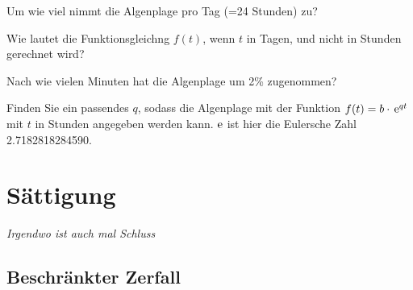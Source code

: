 \begin{bbwAufgabenBlock}

\item Um wie viel nimmt die Algenplage pro Tag (=24 Stunden) zu?



\item Wie lautet die Funktionsgleichng $f(t)$, wenn $t$ in Tagen, und nicht in Stunden gerechnet wird?


\item Nach wie vielen Minuten hat die Algenplage um 2\% zugenommen?


\item Finden Sie ein passendes $q$, sodass die Algenplage mit der Funktion $f(t) = b\cdot{}\operatorname{\mathrm{e}}^{qt}$ mit $t$ in Stunden angegeben werden kann. $\operatorname{\mathrm{e}}$ ist hier die Eulersche Zahl 2.7182818284590.



\end{bbwAufgabenBlock}


\platzFuerBerechnungenBisEndeSeite{}





\newpage
\section{Sättigung}
\textit{Irgendwo ist auch mal Schluss}

\subsection{Beschränkter Zerfall}





